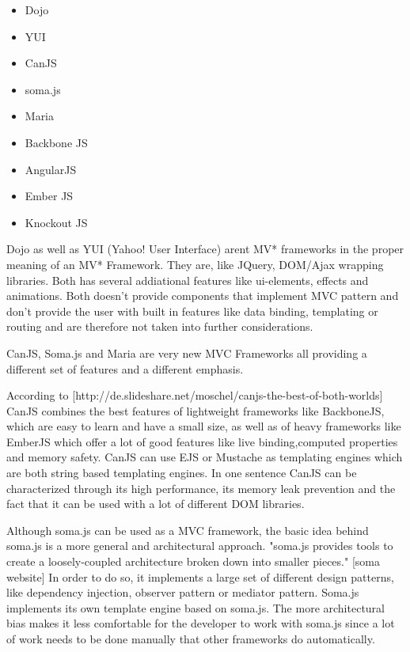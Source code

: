 \begin{itemize}
	\item Dojo
	\item YUI
	\item CanJS
	\item soma.js
	\item Maria
	\item Backbone JS
	\item AngularJS
	\item Ember JS
	\item Knockout JS
\end{itemize}

Dojo as well as YUI (Yahoo! User Interface) arent MV* frameworks in the proper meaning of an MV* Framework. They are, like JQuery, DOM/Ajax wrapping libraries. Both has several addiational features like ui-elements, effects and animations. Both doesn't provide components that implement MVC pattern and don't provide the user with built in features like data binding, templating or routing and are therefore not taken into further considerations.


CanJS, Soma.js and Maria are very new MVC Frameworks all providing a different set of features and a different emphasis. 


According to [http://de.slideshare.net/moschel/canjs-the-best-of-both-worlds] CanJS combines the best features of lightweight frameworks like BackboneJS, which are easy to learn and have a small size, as well as of heavy frameworks like EmberJS which offer a lot of good features like live binding,computed properties and memory safety. CanJS can use EJS or Mustache as templating engines which are both string based templating engines. In one sentence CanJS can be characterized through its high performance, its memory leak prevention and the fact that it can be used with a lot of different DOM libraries. 


Although soma.js can be used as a MVC framework, the basic idea behind soma.js is a more general and architectural approach. "soma.js  provides tools to create a loosely-coupled architecture broken down into smaller pieces." [soma website] In order to do so, it implements a large set of different design patterns, like dependency injection, observer pattern or mediator pattern. Soma.js implements its own template engine based on soma.js. The more architectural bias makes it less comfortable for the developer to work with soma.js since a lot of work needs to be done manually that other frameworks do automatically. 


